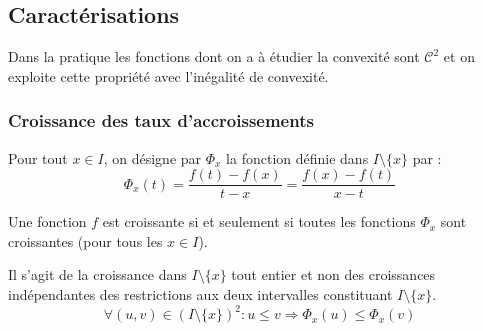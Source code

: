 \subsection{Caractérisations}
Dans la pratique les fonctions dont on a à étudier la convexité sont $\mathcal C ^2$ et on exploite cette propriété avec l'inégalité de convexité.
\subsubsection{Croissance des taux d'accroissements}
\begin{nota}
 Pour tout $x\in I$, on désigne par $\Phi_x$ la fonction définie dans $I\setminus\{x\}$ par :
\begin{displaymath}
 \Phi_x(t)= \dfrac{f(t)-f(x)}{t-x} = \dfrac{f(x)-f(t)}{x-t}
\end{displaymath}
\end{nota}
\begin{prop}
 Une fonction $f$ est croissante si et seulement si toutes les fonctions $\Phi_x$ sont croissantes (pour tous les $x\in I$).
\end{prop}
\begin{rem}
 Il s'agit de la croissance dans $I\setminus\{x\}$ tout entier et non des croissances indépendantes des restrictions aux deux intervalles constituant $I\setminus\{x\}$.
\begin{displaymath}
 \forall (u,v)\in (I\setminus\{x\})^2 : u\leq v \Rightarrow \Phi_x(u) \leq \Phi_x(v)
\end{displaymath}
\end{rem}
